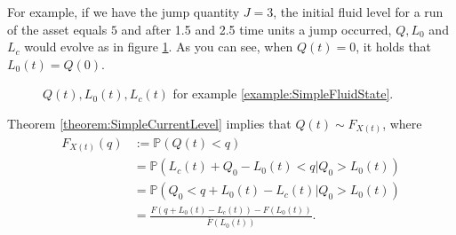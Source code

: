 \begin{example}\label{example:SimpleFluidState}
	For example, if we have the jump quantity $J=3$, the initial fluid level for a run of the asset equals $5$ and after 1.5 and 2.5 time units a jump occurred, $Q,L_0$ and $L_c$ would evolve as in figure \ref{figure:SimpleFluidExampleQuantities}.
	As you can see, when $Q(t)=0$, it holds that $L_0(t)=Q(0)$.
\end{example}
\begin{figure}[H]
\centering
\setlength{}

\caption{$Q(t),L_0(t),L_c(t)$ for example \ref{example:SimpleFluidState}.}
\label{figure:SimpleFluidExampleQuantities}
\end{figure}

\begin{corollary}\label{corollary:SimpleFluidDistribution}
	Theorem \ref{theorem:SimpleCurrentLevel} implies that $Q(t)\sim F_{X(t)}$, where
	\begin{equation}\label{eq:SimpleCurrentDistribution}
	\begin{split}
	F_{X(t)}(q)&:=\mathbb{P}(Q(t)<q)\\
	&=\mathbb{P}(L_c(t)+Q_0-L_0(t)<q|Q_0>L_0(t))\\
	&=\mathbb{P}(Q_0<q+L_0(t)-L_c(t)|Q_0>L_0(t))\\
	&=\frac{F(q+L_0(t)-L_c(t))-F(L_0(t))}{\bar{F}(L_0(t))}.\\
	\end{split}
	\end{equation}
\end{corollary}

